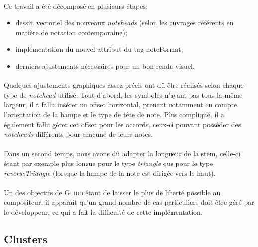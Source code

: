 \documentclass[a4paper,10pt,twocolumn]{article}
\newenvironment{code}
  {\fontfamily{pnc}\selectfont}{}
\begin{document}
\paragraph{}
Ce travail a été décomposé en plusieurs étapes:
\begin{itemize}
    \item dessin vectoriel des nouveaux \emph{noteheads} (selon les ouvrages référents en matière de notation contemporaine);
    \item implémentation du nouvel attribut du tag \begin{code}noteFormat\end{code};
    \item derniers ajustements nécessaires pour un bon rendu visuel.
\end{itemize}

\paragraph{}
Quelques ajustements graphiques assez précis ont dû être réalisés selon chaque type de \emph{notehead} utilisé. Tout d'abord, les symboles n'ayant pas tous la même largeur, il a fallu insérer un offset horizontal, prenant notamment en compte l'orientation de la hampe et le type de tête de note. Plus compliqué, il a également fallu gérer cet offset pour les accords, ceux-ci pouvant posséder des \emph{noteheads} différents pour chacune de leurs notes.

\paragraph{}
Dans un second temps, nous avons dû adapter la longueur de la stem, celle-ci étant par exemple plus longue pour le type \emph{triangle} que pour le type \emph{reverseTriangle} (lorsque la hampe de la note est dirigée vers le haut).

\paragraph{}
Un des objectifs de \textsc{Guido} étant de laisser le plus de liberté possible au compositeur, il apparaît qu'un grand nombre de cas particuliers doit être géré par le développeur, ce qui a fait la difficulté de cette implémentation.

\subsection{Clusters}
\end{document}
